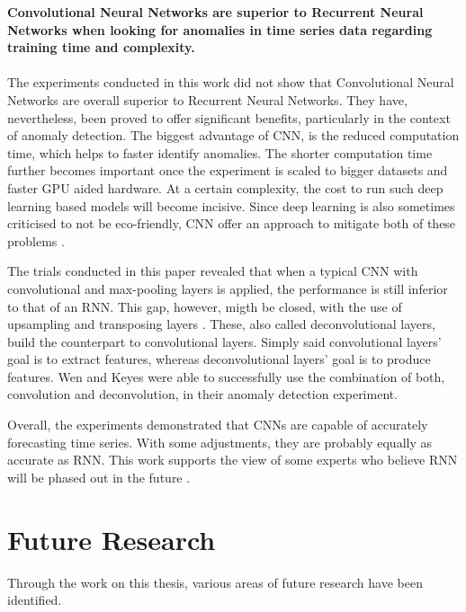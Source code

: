 \textbf{Convolutional Neural Networks are superior to Recurrent Neural Networks when looking for anomalies in time series data regarding training time and complexity.}\\
\\
The experiments conducted in this work did not show that Convolutional Neural Networks are overall superior to Recurrent Neural Networks. They have, nevertheless, been proved to offer significant benefits, particularly in the context of anomaly detection. The biggest advantage of CNN, is the reduced computation time, which helps to faster identify anomalies. The shorter computation time further becomes important once the experiment is scaled to bigger datasets and faster GPU aided hardware. At a certain complexity, the cost to run such deep learning based models will become incisive. Since deep learning is also sometimes criticised to not be eco-friendly, CNN offer an approach to mitigate both of these problems \parencite{Walleser2021}.

The trials conducted in this paper revealed that when a typical CNN with convolutional and max-pooling layers is applied, the performance is still inferior to that of an RNN. This gap, however, migth be closed, with the use of upsampling and transposing layers \parencite{Wen2019}. These, also called deconvolutional layers, build the counterpart to convolutional layers. Simply said convolutional layers' goal is to extract features, whereas deconvolutional layers' goal is to produce features. Wen and Keyes \parencite*{Wen2019} were able to successfully use the combination of both, convolution and deconvolution, in their anomaly detection experiment.

Overall, the experiments demonstrated that CNNs are capable of accurately forecasting time series. With some adjustments, they are probably equally as accurate as RNN. This work supports the view of some experts who believe RNN will be phased out in the future \parencite{Culurciello2018} \parencite{Bai2018}. 

\clearpage
\section{Future Research}
Through the work on this thesis, various areas of future research have been identified.

